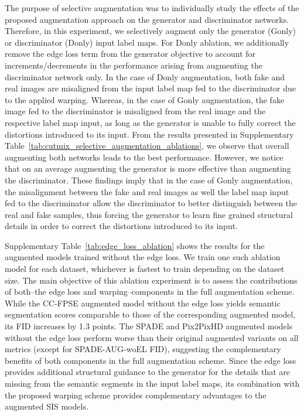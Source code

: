 \documentclass[final]{cvpr}
\newcommand\+{\mkern4mu}
\begin{document}
The purpose of selective augmentation was to individually study the effects of the proposed augmentation approach on the generator and discriminator networks. Therefore, in this experiment, we selectively augment only the generator (Gonly) or discriminator (Donly) input label maps. For Donly ablation, we additionally remove the edge loss term from the generator objective to account for increments/decrements in the performance arising from augmenting the discriminator network only. In the case of Donly augmentation, both fake and real images are misaligned from the input label map fed to the discriminator due to the applied warping. Whereas, in the case of Gonly augmentation, the fake image fed to the discriminator is misaligned from the real image and the respective label map input, as long as the generator is unable to fully correct the distortions introduced to its input. From the results presented in Supplementary Table~\ref{tab:cutmix_selective_augmentation_ablations}, we observe that overall augmenting both networks leads to the best performance. However, we notice that on an average augmenting the generator is more effective than augmenting the discriminator. These findings imply that in the case of Gonly augmentation, the misalignment between the fake and real images as well the label map input fed to the discriminator allow the discriminator to better distinguish between the real and fake samples, thus forcing the generator to learn fine grained structural details in order to correct the distortions introduced to its input.         

Supplementary Table~\ref{tab:edge_loss_ablation} shows the results for the augmented models trained without the edge loss. We train one such ablation model for each dataset, whichever is fastest to train depending on the dataset size. The main objective of this ablation experiment is to assess the contributions of both--the edge loss and warping--components in the full augmentation scheme. While the CC-FPSE augmented model without the edge loss yields semantic segmentation scores comparable to those of the corresponding augmented model, its FID increases by 1.3 points. The SPADE and Pix2PixHD augmented models without the edge loss perform worse than their original augmented variants on all metrics (except for SPADE-AUG-woEL FID), suggesting the complementary benefits of both components in the full augmentation scheme. Since the edge loss provides additional structural guidance to the generator for the details that are missing from the semantic segments in the input label maps, its combination with the proposed warping scheme provides complementary advantages to the augmented SIS models.
\end{document}
